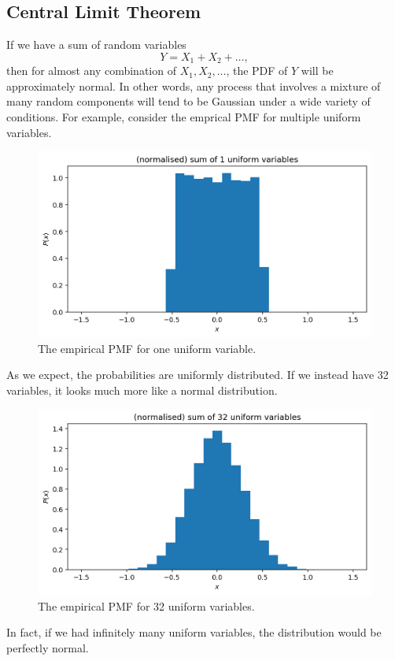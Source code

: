 \documentclass[a4paper, openany]{memoir}
\begin{document}
\subsection{Central Limit Theorem}
If we have a sum of random variables
\[Y = X_1 + X_2 + \dots, \]
then for almost any combination of $X_1, X_2, \dots$, the PDF of $Y$ will be approximately normal. In other words, any process that involves a mixture of many random components will tend to be Gaussian under a wide variety of conditions. For example, consider the emprical PMF for multiple uniform variables.
\begin{figure}[H]
    \centering
    \includegraphics[scale=0.5]{src/5.17 sum of 1 uniform variable.png}
    \caption{The empirical PMF for one uniform variable.}
\end{figure}
\noindent As we expect, the probabilities are uniformly distributed. If we instead have 32 variables, it looks much more like a normal distribution.
\begin{figure}[H]
    \centering
    \includegraphics[scale=0.5]{src/5.18 sum of 32 uniform variables.png}
    \caption{The empirical PMF for 32 uniform variables.}
\end{figure}
\noindent In fact, if we had infinitely many uniform variables, the distribution would be perfectly normal.
\newpage
\end{document}
